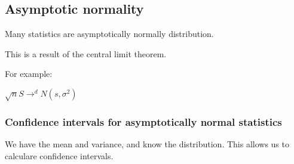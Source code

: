 
\subsection{Asymptotic normality}

Many statistics are asymptotically normally distribution.

This is a result of the central limit theorem.

For example:

\(\sqrt n S\rightarrow^d N(s, \sigma^2) \)

\subsubsection{Confidence intervals for asymptotically normal statistics}

We have the mean and variance, and know the distribution. This allows us to calculare confidence intervals.

